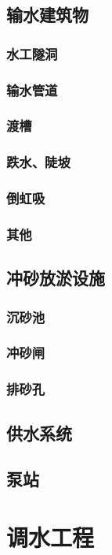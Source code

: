 \documentclass[UTF8]{../../ApplicationUniverse}
\begin{document}
    \subsection{输水建筑物}
        \subsubsection{水工隧洞}
        \subsubsection{输水管道}
        \subsubsection{渡槽}
        \subsubsection{跌水、陡坡}
        \subsubsection{倒虹吸}
        \subsubsection{其他}
    \subsection{冲砂放淤设施}
        \subsubsection{沉砂池}
        \subsubsection{冲砂闸}
        \subsubsection{排砂孔}
    \subsection{供水系统}
    \subsection{泵站}
\section{调水工程}
\end{document}
